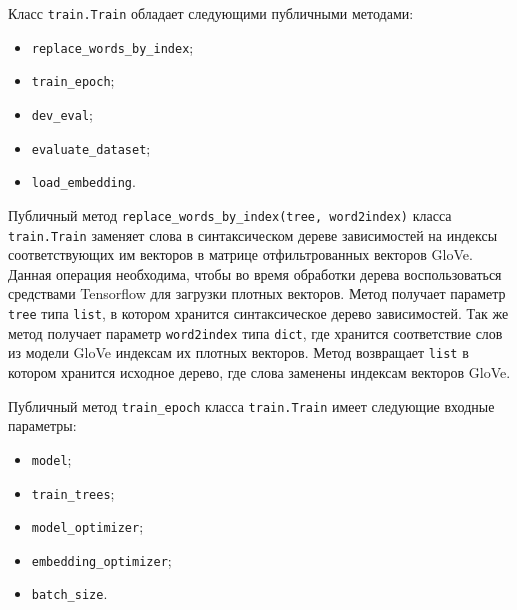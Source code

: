 Класс \texttt{train.Train} обладает следующими публичными методами:
\begin{itemize}
\item \texttt{replace\_words\_by\_index};
\item \texttt{train\_epoch};
\item \texttt{dev\_eval};
\item \texttt{evaluate\_dataset};
\item \texttt{load\_embedding}.
\end{itemize}

Публичный метод \texttt{replace\_words\_by\_index(tree, word2in\-dex)} класса \texttt{train.Train} заменяет слова в синтаксическом дереве зависимостей на индексы соответствующих им векторов в матрице отфильтрованных векторов GloVe. Данная операция необходима, чтобы во время обработки дерева воспользоваться средствами Tensorflow для загрузки плотных векторов.  Метод получает параметр \texttt{tree} типа \texttt{list}, в котором хранится синтаксическое дерево зависимостей. Так же метод получает параметр \texttt{word2index} типа \texttt{dict}, где хранится соответствие слов из модели GloVe индексам их плотных векторов. Метод возвращает \texttt{list} в котором хранится исходное дерево, где слова заменены индексам векторов GloVe.

Публичный метод \texttt{train\_epoch} класса \texttt{train.Train} имеет следующие входные параметры:
\begin{itemize}
\item \texttt{model};
\item \texttt{train\_trees};
\item \texttt{model\_optimizer};
\item \texttt{embedding\_optimizer};
\item \texttt{batch\_size}.
\end{itemize}

